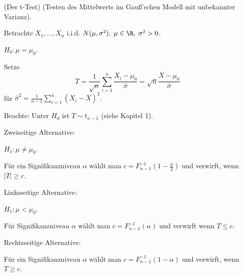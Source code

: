 \documentclass{tstextbook}
\begin{document}
\begin{example}(Der t-Test)
	(Testen des Mittelwerts im Gauß'schen Modell mit unbekannter Varianz).
	
		Betrachte $ X_1,\ldots,X_n $ i.i.d. $ N(\mu,\sigma^2), \; \mu\in\R, \;\sigma^2>0 $. 
	
	$ H_0\colon \mu=\mu_0 $. 
	
	Setze \[ T = \frac{1}{\sqrt{n}}\sum_{i=1}^{n}\frac{X_i-\mu_0}{\hat{\sigma}} = \sqrt{n}\frac{\bar{X}-\mu_0}{\hat{\sigma}} \] für $ \hat{\sigma}^2 = \frac{1}{n-1}\sum_{i=1}^{n}(X_i-\bar{X})^2 $.
	
	Beachte: Unter $ H_0 $ ist $ T\sim t_{n-1} $ (siehe Kapitel 1).
	
	Zweiseitige Alternative:
	
	$ H_1\colon \mu\ne\mu_0 $.
	
	Für ein Signifikanzniveau $ \alpha $ wählt man $ c=F_{n-1}^{-1}\left(1-\frac{\alpha}{2}\right) $ und verwirft, wenn $ |T|\ge c $. 
	
	Linksseitige Alternative: 
	
	$ H_1\colon \mu < \mu_0 $. 
	
	Für Signifikanzniveau $ \alpha $ wählt man $ c=F_{n-1}^{-1}(\alpha) $ und verwirft wenn $ T\le c $. 
	
	Rechtsseitige Alternative:
	
	Für ein Signifikanzniveau $ \alpha $ wählt man $ c=F_{n-1}^{-1}\left(1-\alpha\right) $ und verwirft, wenn $ T\ge c $.
	
	
\end{example}
\end{document}
